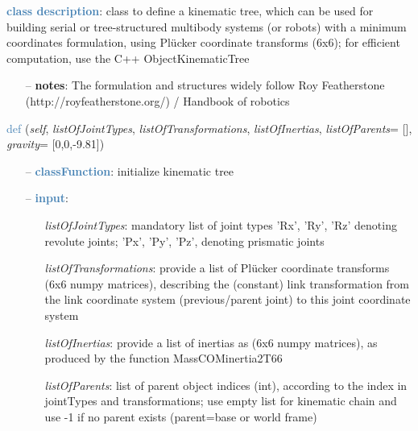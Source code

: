 \begin{itemize}[leftmargin=1.4cm]
\begin{itemize}[leftmargin=1.4cm]
\begin{itemize}[leftmargin=0.5cm]
\begin{itemize}[leftmargin=1.4cm]
\begin{itemize}[leftmargin=1.4cm]
\begin{itemize}[leftmargin=0.5cm]
\begin{itemize}[leftmargin=1.4cm]
\begin{itemize}[leftmargin=0.5cm]
\begin{itemize}[leftmargin=1.4cm]
\begin{itemize}[leftmargin=1.4cm]
\begin{itemize}[leftmargin=1.4cm]
%
\noindent\textcolor{steelblue}{{\bf class description}}:  class to define a kinematic tree, which can be used for building serial or tree-structured multibody systems
         (or robots) with a minimum coordinates formulation, using Pl\"ucker coordinate transforms (6x6); for efficient computation, use the C++ ObjectKinematicTree
\setlength{\itemindent}{0.7cm}
\begin{itemize}[leftmargin=0.7cm]
\item[--]
{\bf notes}: The formulation and structures widely follow Roy Featherstone (http://royfeatherstone.org/) / Handbook of robotics \cite{Siciliano2016}
\vspace{24pt}\end{itemize}
%
\begin{flushleft}
\noindent \textcolor{steelblue}{def {\bf {}}}\label{sec:kinematicTree:KinematicTree66:__init__}
({\it self}, {\it listOfJointTypes}, {\it listOfTransformations}, {\it listOfInertias}, {\it listOfParents}= [], {\it gravity}= [0,0,-9.81])
\end{flushleft}
\setlength{\itemindent}{0.7cm}
\begin{itemize}[leftmargin=0.7cm]
\item[--]\textcolor{steelblue}{\bf classFunction}: initialize kinematic tree
\item[--]\textcolor{steelblue}{\bf input}: \vspace{-6pt}
\begin{itemize}[leftmargin=1.2cm]
\setlength{\itemindent}{-0.7cm}
\item[]{\it listOfJointTypes}: mandatory list of joint types 'Rx', 'Ry', 'Rz' denoting revolute joints; 'Px', 'Py', 'Pz', denoting prismatic joints
\item[]{\it listOfTransformations}: provide a list of Pl\"ucker coordinate transforms (6x6 numpy matrices), describing the (constant) link transformation from the link coordinate system (previous/parent joint) to this joint coordinate system
\item[]{\it listOfInertias}: provide a list of inertias as (6x6 numpy matrices), as produced by the function MassCOMinertia2T66
\item[]{\it listOfParents}: list of parent object indices (int), according to the index in jointTypes and transformations; use empty list for kinematic chain and use -1 if no parent exists (parent=base or world frame)

\end{itemize}
\end{itemize}
\end{itemize}
\end{itemize}
\end{itemize}
\end{itemize}
\end{itemize}
\end{itemize}
\end{itemize}
\end{itemize}
\end{itemize}
\end{itemize}
\end{itemize}
